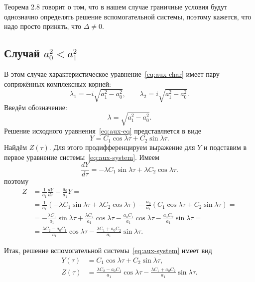 \documentclass[a4paper,14pt]{article}
\theoremstyle{definition}
\begin{document}
Теорема 2.8 говорит о том, что в нашем случае
граничные условия будут однозначно определять решение
вспомогательной системы, поэтому кажется, что надо
просто принять, что $\Delta \neq 0$.

\subsection{Случай $a_0^2 < a_1^2$}

В этом случае характеристическое уравнение~\eqref{eq:aux-char}
имеет пару сопряжённых комплексных корней:
\begin{equation*}
  \lambda_1 = -i \sqrt{a_1^2 - a_0^2},
  \qquad
  \lambda_2 = i \sqrt{a_1^2 - a_0^2}.
\end{equation*}
Введём обозначение:
\begin{equation*}
  \lambda = \sqrt{a_1^2 - a_0^2}.
\end{equation*}
Решение исходного уравнения~\eqref{eq:aux-eq} представляется в
виде
\begin{equation*}
  Y = C_1 \cos \lambda \tau + C_2 \sin \lambda \tau.
\end{equation*}
Найдём $Z(\tau)$. Для этого продифференцируем выражение для $Y$
и подставим в первое уравнение системы~\eqref{eq:aux-system}.
Имеем
\begin{equation*}
  \frac{d Y}{d \tau}
  = - \lambda C_1 \sin \lambda \tau
  + \lambda C_2 \cos \lambda \tau.
\end{equation*}
поэтому
\begin{equation*}
  \begin{aligned}
    Z
    &=
      \frac{1}{a_1} \frac{d Y}{d \tau} - \frac{a_0}{a_1} Y = \\
    &=
      \frac{1}{a_1} \left(
      - \lambda C_1 \sin \lambda \tau
      + \lambda C_2 \cos \lambda \tau
      \right)
      - \frac{a_0}{a_1} \left(
      C_1 \cos \lambda \tau + C_2 \sin \lambda \tau
      \right) = \\
    &=
      - \frac{\lambda C_1}{a_1} \sin \lambda \tau
      + \frac{\lambda C_2}{a_1} \cos \lambda \tau
      - \frac{a_0 C_1}{a_1} \cos \lambda \tau
      - \frac{a_0 C_2}{a_1} \sin \lambda \tau = \\
    &=
      \frac{\lambda C_2 - a_0 C_1}{a_1}
      \cos \lambda \tau
      -
      \frac{\lambda C_1 + a_0 C_2}{a_1}
      \sin \lambda \tau.
  \end{aligned}
\end{equation*}

Итак, решение вспомогательной системы~\eqref{eq:aux-system}
имеет вид
\begin{equation}
  \label{eq:aux-system-gen-solution}
  \begin{aligned}
    Y(\tau)
    &=
      C_1 \cos \lambda \tau + C_2 \sin \lambda \tau, \\
    Z(\tau)
    &=
      \frac{\lambda C_2 - a_0 C_1}{a_1}
      \cos \lambda \tau
      -
      \frac{\lambda C_1 + a_0 C_2}{a_1}
      \sin \lambda \tau.
  \end{aligned}
\end{equation}
\end{document}
